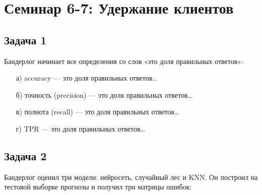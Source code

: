 \documentclass[12pt, a4paper, oneside]{article}
\begin{document}
\section*{Семинар 6-7: Удержание клиентов}

\subsection*{Задача 1}

	Бандерлог начинает все определения со слов «это доля правильных ответов»:
	\begin{enumerate}
		\item[а)] accuracy — это доля правильных ответов\ldots
		\item[б)] точность (precision) — это доля правильных ответов\ldots
		\item[в)] полнота (recall) — это доля правильных ответов\ldots
		\item[г)] TPR — это доля правильных ответов\ldots
	\end{enumerate}


\subsection*{Задача 2}

Бандерлог оценил три модели: нейросеть, случайный лес и KNN.  Он построил на тестовой выборке прогнозы и получил три матрицы ошибок: 
\end{document}
